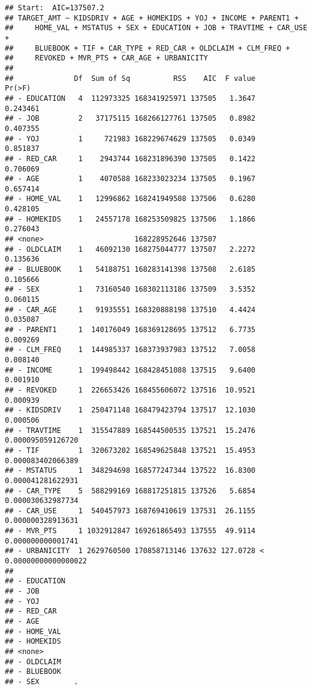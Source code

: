 \documentclass[
]{article}
\begin{document}
\begin{verbatim}
## Start:  AIC=137507.2
## TARGET_AMT ~ KIDSDRIV + AGE + HOMEKIDS + YOJ + INCOME + PARENT1 + 
##     HOME_VAL + MSTATUS + SEX + EDUCATION + JOB + TRAVTIME + CAR_USE + 
##     BLUEBOOK + TIF + CAR_TYPE + RED_CAR + OLDCLAIM + CLM_FREQ + 
##     REVOKED + MVR_PTS + CAR_AGE + URBANICITY
## 
##              Df  Sum of Sq          RSS    AIC  F value                Pr(>F)
## - EDUCATION   4  112973325 168341925971 137505   1.3647              0.243461
## - JOB         2   37175115 168266127761 137505   0.8982              0.407355
## - YOJ         1     721983 168229674629 137505   0.0349              0.851837
## - RED_CAR     1    2943744 168231896390 137505   0.1422              0.706069
## - AGE         1    4070588 168233023234 137505   0.1967              0.657414
## - HOME_VAL    1   12996862 168241949508 137506   0.6280              0.428105
## - HOMEKIDS    1   24557178 168253509825 137506   1.1866              0.276043
## <none>                     168228952646 137507                               
## - OLDCLAIM    1   46092130 168275044777 137507   2.2272              0.135636
## - BLUEBOOK    1   54188751 168283141398 137508   2.6185              0.105666
## - SEX         1   73160540 168302113186 137509   3.5352              0.060115
## - CAR_AGE     1   91935551 168320888198 137510   4.4424              0.035087
## - PARENT1     1  140176049 168369128695 137512   6.7735              0.009269
## - CLM_FREQ    1  144985337 168373937983 137512   7.0058              0.008140
## - INCOME      1  199498442 168428451088 137515   9.6400              0.001910
## - REVOKED     1  226653426 168455606072 137516  10.9521              0.000939
## - KIDSDRIV    1  250471148 168479423794 137517  12.1030              0.000506
## - TRAVTIME    1  315547889 168544500535 137521  15.2476     0.000095059126720
## - TIF         1  320673202 168549625848 137521  15.4953     0.000083402066389
## - MSTATUS     1  348294698 168577247344 137522  16.8300     0.000041281622931
## - CAR_TYPE    5  588299169 168817251815 137526   5.6854     0.000030632987734
## - CAR_USE     1  540457973 168769410619 137531  26.1155     0.000000328913631
## - MVR_PTS     1 1032912847 169261865493 137555  49.9114     0.000000000001741
## - URBANICITY  1 2629760500 170858713146 137632 127.0728 < 0.00000000000000022
##                 
## - EDUCATION     
## - JOB           
## - YOJ           
## - RED_CAR       
## - AGE           
## - HOME_VAL      
## - HOMEKIDS      
## <none>          
## - OLDCLAIM      
## - BLUEBOOK      
## - SEX        .  

\end{verbatim}
\end{document}
